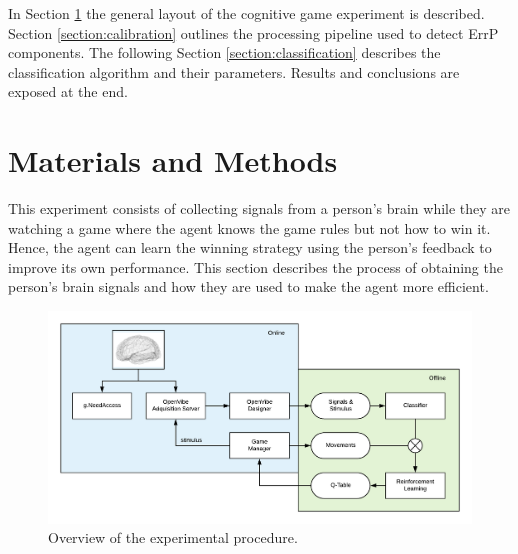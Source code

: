 \documentclass[journal]{IEEEtran}
\begin{document}

In Section \ref{section:materials} the general layout of the cognitive game experiment is described. Section \ref{section:calibration} outlines the processing pipeline used to detect ErrP components. The following Section \ref{section:classification} describes the classification algorithm and their parameters.   Results and conclusions are exposed at the end.

\section{Materials and Methods}
\label{section:materials}

This experiment consists of collecting signals from a person's brain while they are watching a game where the agent knows the game rules but not how to win it. Hence, the agent can learn the winning strategy using the person's feedback to improve its own performance. This section describes the process of obtaining the person's brain signals and how they are used to make the agent more efficient.

\begin{figure}[h]
    \centering
    \includegraphics[scale=0.4]{Images/complete_flow.png}
    \caption{Overview of the experimental procedure.}
    \label{diag:complete_flow}
\end{figure}
\end{document}
